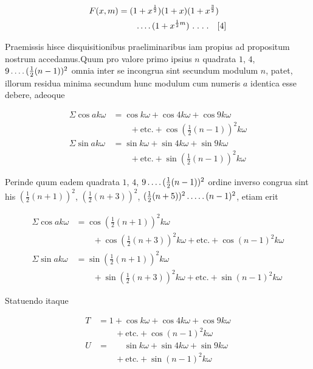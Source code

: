 \[
\begin{aligned}
F(x,m)&=(1+x^{\frac12})(1+x)(1+x^{\frac32})\\&\qquad\dotsfour(1+x^{\frac12m})\ .\; .\; .\; .\quad[4]
\end{aligned}
\]


Praemissis hisce disquisitionibus praeliminaribus iam propius ad propositum nostrum accedamus.\quad Quum pro valore primo ipsius $n$ quadrata $1$, $4$, $9\mathinner{.\,.\,.\,.}(\frac12(n-1))^2$ omnia inter se incongrua sint secundum modulum $n$, patet, illorum residua minima secundum hunc modulum cum numeris $a$ identica esse debere, adeoque

\[
\begin{aligned}
\Sigma\cos ak\omega&=\cos k\omega+\cos4k\omega+\cos9k\omega\\&\qquad+\text{etc.}+\cos(\tfrac12(n-1))^2k\omega\\
\Sigma\sin ak\omega&=\sin k\omega+\sin4k\omega+\sin9k\omega\\&\qquad+\text{etc.}+\sin(\tfrac12(n-1))^2k\omega
\end{aligned}
\]

Perinde quum eadem quadrata $1$, $4$, $9\mathinner{.\,.\,.\,.}(\frac12(n-1))^2$ ordine inverso congrua sint his $(\frac12(n+1))^2$, $(\frac12(n+3))^2$, $(\frac12(n+5))^2\mathinner{.\,.\,.\,.\,.}(n-1)^2$, etiam erit

%
\[
\begin{aligned}
\Sigma\cos ak\omega&=\cos(\tfrac12(n+1))^2k\omega\\&\qquad+\cos(\tfrac12(n+3))^2k\omega+\text{etc.}+\cos(n-1)^2k\omega\\
\Sigma\sin ak\omega&=\sin(\tfrac12(n+1))^2k\omega\\&\qquad+\sin(\tfrac12(n+3))^2k\omega+\text{etc.}+\sin(n-1)^2k\omega
\end{aligned}
\]

Statuendo itaque

\[
\begin{aligned}
T&=1+\cos k\omega+\cos4k\omega+\cos9k\omega\\&\qquad+\text{etc.}+\cos(n-1)^2k\omega\\
U&=\phantom{1+}\sin k\omega+\sin4k\omega+\sin9k\omega\\&\qquad+\text{etc.}+\sin(n-1)^2k\omega
\end{aligned}
\]

